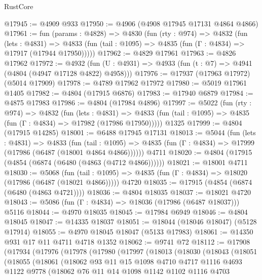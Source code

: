 \begin{lexlean}{RustCore}
\begin{coremodule}
@17945 := @4909 @933
@17950 := @4906 (@4908 @17945 @17131 @4864 @4866)
@17961 := fun (params : @4828) =>
  @4830
    (fun (rty : @974) =>
    @4832
      (fun (lets : @4831) =>
      @4833 (fun (tail : @1095) => @4835 (fun (Γ : @4834) => @17917 (@17944 @17950)))))
@17962 := @4829 @17961
@17963 := @4826 @17962
@17972 := @4932
    (fun (U : @4931) => @4933 (fun (t : @7) => @4941 (@4804 (@4947 @17128 @4822) @4958)))
@17976 := @17937 (@17963 @17972) (@5014 @17909)
@17978 := @4789 @17962 @17972
@17980 := @5019 @17961 @1405
@17982 := @4804 (@17915 @6876)
@17983 := @17940 @6879
@17984 := @4875 @17983
@17986 := @4804 (@17984 @4896)
@17997 := @5022
    (fun (rty : @974) =>
    @4832
      (fun (lets : @4831) =>
      @4833 (fun (tail : @1095) => @4835 (fun (Γ : @4834) => @17982 (@17986 @17950)))))
    @1325
@17999 := @4804 (@17915 @14285)
@18001 := @6488 @17945 @17131
@18013 := @5044
    (fun (lets : @4831) =>
    @4833
      (fun (tail : @1095) =>
      @4835 (fun (Γ : @4834) => @17999 (@17986 (@6487 (@18001 @4864 @4866))))))
    @4711
@18020 := @4804 (@17915 (@4854 (@6874 (@6480 (@4863 (@4712 @4866))))))
@18021 := @18001 @4711
@18030 := @5068
    (fun (tail : @1095) => @4835 (fun (Γ : @4834) => @18020 (@17986 (@6487 (@18021 @4866)))))
    @4720
@18035 := @17915 (@4854 (@6874 (@6480 (@4863 @4721))))
@18036 := @4804 @18035
@18037 := @18021 @4720
@18043 := @5086 (fun (Γ : @4834) => @18036 (@17986 (@6487 @18037))) @5116
@18044 := @4970 @18035
@18045 := @17984 @6949
@18046 := @4804 @18045
@18047 := @14335 @18037
@18051 := @18044 (@18046 @18047) (@5128 @17914)
@18055 := @4970 @18045 @18047 (@5133 @17983)
@18061 := @14350 @931 @17 @11 @4711 @4718 @1352
@18062 := @9741 @72
@18112 := @17908
    (@17934
      (@17976
        (@17978
          (@17980
            (@17997
              (@18013
                (@18030
                  (@18043
                    (@18051
                      (@18055
                        (@18061
                          (@18062
                            @93
                            @11
                            @15
                            @1098
                            @4710
                            @4717
                            @1116
                            @4693
                            @1122
                            @9778
                            (@18062
                              @76
                              @11
                              @14
                              @1098
                              @1142
                              @1102
                              @1116
                              @4703

\end{coremodule}
\end{lexlean}
